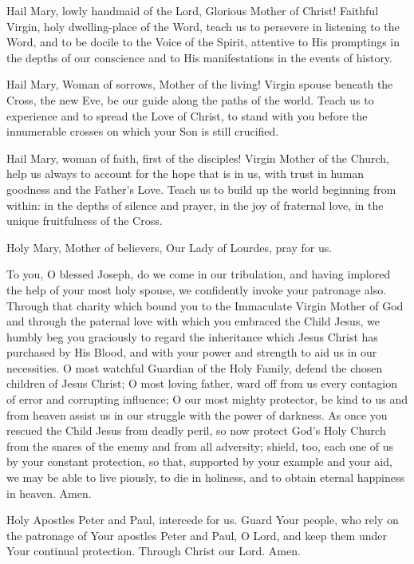 Hail Mary, lowly handmaid of the Lord, Glorious Mother of Christ!
Faithful Virgin, holy dwelling-place of the Word, teach us to persevere in listening to the Word, and to be docile to the Voice of the Spirit, attentive to His promptings in the depths of our conscience and to His manifestations in the events of history.

Hail Mary, Woman of sorrows, Mother of the living!
Virgin spouse beneath the Cross, the new Eve, be our guide along the paths of the world.
Teach us to experience and to spread the Love of Christ, to stand with you before the innumerable crosses on which your Son is still crucified.

Hail Mary, woman of faith, first of the disciples!
Virgin Mother of the Church, help us always to account for the hope that is in us, with trust in human goodness and the Father's Love.
Teach us to build up the world beginning from within:
in the depths of silence and prayer, in the joy of fraternal love, in the unique fruitfulness of the Cross.

Holy Mary, Mother of believers, Our Lady of Lourdes, pray for us.

To you, O blessed Joseph, do we come in our tribulation, and having implored the help of your most holy spouse, we confidently invoke your patronage also.
Through that charity which bound you to the Immaculate Virgin Mother of God and through the paternal love with which you embraced the Child Jesus, we humbly beg you graciously to regard the inheritance which Jesus Christ has purchased by His Blood, and with your power and strength to aid us in our necessities.
O most watchful Guardian of the Holy Family, defend the chosen children of Jesus Christ;
O most loving father, ward off from us every contagion of error and corrupting influence;
O our most mighty protector, be kind to us and from heaven assist us in our struggle with the power of darkness.
As once you rescued the Child Jesus from deadly peril, so now protect God's Holy Church from the snares of the enemy and from all adversity;
shield, too, each one of us by your constant protection, so that, supported by your example and your aid, we may be able to live piously, to die in holiness, and to obtain eternal happiness in heaven.
Amen.

Holy Apostles Peter and Paul, intercede for us.
Guard Your people, who rely on the patronage of Your apostles Peter and Paul, O Lord, and keep them under Your continual protection.
Through Christ our Lord. Amen.

